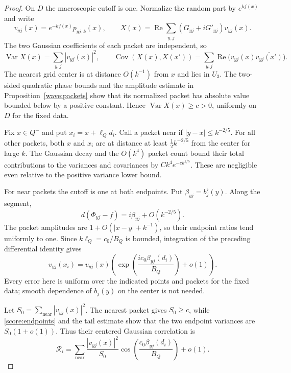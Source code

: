 \begin{proof}
On $D$ the macroscopic cutoff is one.  Normalize the random part by
$e^{kf(x)}$ and write
\[
 v_{yj}(x)=e^{-kf(x)}p_{yj,k}(x),\qquad
 X(x)=\operatorname{Re}\sum_{y,j}(G_{yj}+iG'_{yj})v_{yj}(x).
\]
The two Gaussian coefficients of each packet are independent, so
\begin{equation}\label{score:covariance}
 \operatorname{Var}X(x)=\sum_{y,j}|v_{yj}(x)|^2,\qquad
 \operatorname{Cov}(X(x),X(x'))
 =\sum_{y,j}\operatorname{Re}\bigl(v_{yj}(x)\overline{v_{yj}(x')}\bigr).
\end{equation}
The nearest grid center is at distance $O(k^{-1})$ from $x$ and lies in
$U_3$.  The two-sided quadratic phase bounds and the amplitude estimate
in Proposition~\ref{wave:packets} show that its normalized packet has
absolute value bounded below by a positive constant.  Hence
$\operatorname{Var}X(x)\ge c>0$, uniformly on $D$ for the fixed data.

Fix $x\in Q^-$ and put $x_i=x+\ell_Qd_i$.  Call a packet near if
$|y-x|\le k^{-2/5}$.  For all other packets, both $x$ and $x_i$ are
at distance at least $\tfrac12 k^{-2/5}$ from the center for large $k$.
The Gaussian decay and the $O(k^4)$ packet count bound their total
contributions to the variances and covariances by
$Ck^4e^{-ck^{1/5}}$.  These are negligible even relative to the positive
variance lower bound.

For near packets the cutoff is one at both endpoints.  Put
$\beta_{yj}=b_j^\flat(y)$.  Along the segment,
\[
 d(\Phi_{yj}-f)=i\beta_{yj}+O(k^{-2/5}).
\]
The packet amplitudes are $1+O(|x-y|+k^{-1})$, so their endpoint
ratios tend uniformly to one.  Since $k\ell_Q=c_0/B_Q$ is bounded,
integration of the preceding differential identity gives
\begin{equation}\label{score:endpoints}
 v_{yj}(x_i)=v_{yj}(x)
 \left(\exp\!\left(\frac{ic_0\beta_{yj}(d_i)}{B_Q}\right)+o(1)\right).
\end{equation}
Every error here is uniform over the indicated points and packets for
the fixed data; smooth dependence of $b_j(y)$ on the center is not needed.

Let $S_0=\sum_{\mathrm{near}}|v_{yj}(x)|^2$.  The nearest packet gives
$S_0\ge c$, while \eqref{score:endpoints} and the tail estimate show
that the two endpoint variances are $S_0(1+o(1))$.  Thus their centered
Gaussian correlation is
\begin{equation}\label{score:correlation}
 \mathcal R_i=
 \sum_{\mathrm{near}}\frac{|v_{yj}(x)|^2}{S_0}
 \cos\!\left(\frac{c_0\beta_{yj}(d_i)}{B_Q}\right)+o(1).
\end{equation}


\end{proof}
